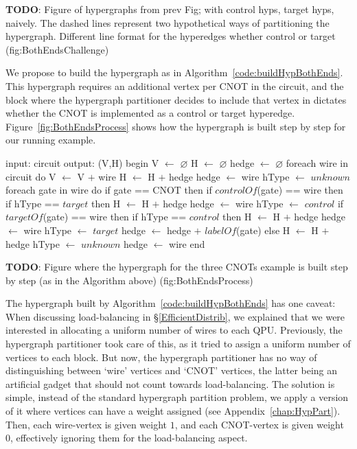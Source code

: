 \textbf{TODO}: Figure of hypergraphs from prev Fig; with control hyps, target hyps, naively. The dashed lines represent two hypothetical ways of partitioning the hypergraph. Different line format for the hyperedges whether control or target (fig:BothEndsChallenge)

We propose to build the hypergraph as in Algorithm~\ref{code:buildHypBothEnds}. This hypergraph requires an additional vertex per CNOT in the circuit, and the block where the hypergraph partitioner decides to include that vertex in dictates whether the CNOT is implemented as a control or target hyperedge. Figure~\ref{fig:BothEndsProcess} shows how the hypergraph is built step by step for our running example. 

\begin{algorithm}[caption={Builds the hypergraph of a given circuit, without choosing whether CNOT gates are implemented through common control or common target.}, label={code:buildHypBothEnds}]
input: circuit
output: (V,H)
begin
  V $\gets$ $\varnothing$
  H $\gets$ $\varnothing$
  hedge $\gets$ $\varnothing$
  foreach wire in circuit do
    V $\gets$ V $+$ {wire}
    H $\gets$ H $+$ {hedge}
    hedge $\gets$ {wire}
    hType $\gets$ $unknown$
    foreach gate in wire do
      if gate == CNOT then
        if $controlOf$(gate) == wire then
          if hType == $target$ then
            H $\gets$ H $+$ {hedge}
            hedge $\gets$ {wire}
          hType $\gets$ $control$
        if $targetOf$(gate) == wire then
          if hType == $control$ then
            H $\gets$ H $+$ {hedge}
            hedge $\gets$ {wire}  
          hType $\gets$ $target$
        hedge $\gets$ hedge $+$ {$labelOf$(gate)}
      else
        H $\gets$ H $+$ {hedge}
        hType $\gets$ $unknown$
        hedge $\gets$ {wire}
end
\end{algorithm}

\textbf{TODO}: Figure where the hypergraph for the three CNOTs example is built step by step (as in the Algorithm above) (fig:BothEndsProcess)

The hypergraph built by Algorithm~\ref{code:buildHypBothEnds} has one caveat: When discussing load-balancing in \S\ref{EfficientDistrib}, we explained that we were interested in allocating a uniform number of wires to each QPU. Previously, the hypergraph partitioner took care of this, as it tried to assign a uniform number of vertices to each block. But now, the hypergraph partitioner has no way of distinguishing between `wire' vertices and `CNOT' vertices, the latter being an artificial gadget that should not count towards load-balancing. The solution is simple, instead of the standard hypergraph partition problem, we apply a version of it where vertices can have a weight assigned (see Appendix~\ref{chap:HypPart}). Then, each wire-vertex is given weight \(1\), and each CNOT-vertex is given weight \(0\), effectively ignoring them for the load-balancing aspect.

